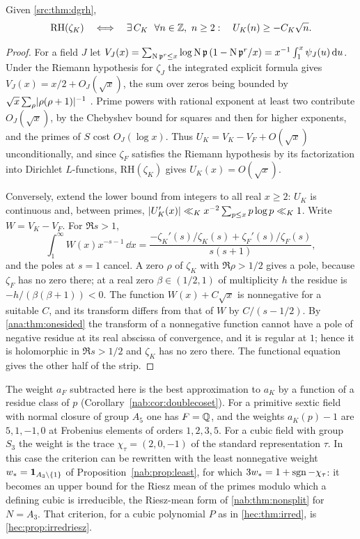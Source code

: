 \begin{theorem}\label{nab:thm:missing}
Given \cref{src:thm:dgrh},
\[
 \mathrm{RH}(\zeta_K)\quad\Longleftrightarrow\quad
 \exists\,C_K\ \ \forall n\in\mathbb{Z},\ n\ge2:\quad U_K(n)\ge-C_K\sqrt n .
\]
\end{theorem}
\begin{proof}
For a field $J$ let
$V_J(x)=\sum_{\operatorname{N}\mathfrak p^r\le x}\log\operatorname{N}\mathfrak p\,(1-\operatorname{N}\mathfrak p^r/x)
=x^{-1}\int_1^x\psi_J(u)\,\mathrm{d} u$. Under the Riemann hypothesis for $\zeta_J$ the integrated
explicit formula gives $V_J(x)=x/2+O_J(\sqrt x)$, the sum over zeros being bounded by
$\sqrt x\sum_\rho\lvert\rho(\rho+1)\rvert^{-1}$ \cite{GrenieMolteni2016Smoothed}. Prime powers
with rational exponent at least two contribute $O_J(\sqrt x)$, by the Chebyshev bound for
squares and then for higher exponents, and the primes of $S$ cost $O_J(\log x)$. Thus
$U_K=V_K-V_F+O(\sqrt x)$ unconditionally, and since $\zeta_F$ satisfies the Riemann
hypothesis by its factorization into Dirichlet $L$-functions, $\mathrm{RH}(\zeta_K)$ gives
$U_K(x)=O(\sqrt x)$.

Conversely, extend the lower bound from integers to all real $x\ge2$: $U_K$ is continuous
and, between primes, $\lvert U_K'(x)\rvert\ll_Kx^{-2}\sum_{p\le x}p\log p\ll_K1$. Write
$W=V_K-V_F$. For $\Re s>1$,
\[
 \int_1^\infty W(x)x^{-s-1}\,\dd x
 =\frac{-\zeta_K'(s)/\zeta_K(s)+\zeta_F'(s)/\zeta_F(s)}{s(s+1)},
\]
and the poles at $s=1$ cancel. A zero $\rho$ of $\zeta_K$ with $\Re\rho>1/2$ gives a pole,
because $\zeta_F$ has no zero there; at a real zero $\beta\in(1/2,1)$ of multiplicity $h$
the residue is $-h/(\beta(\beta+1))<0$. The function $W(x)+C\sqrt x$ is nonnegative for a
suitable $C$, and its transform differs from that of $W$ by $C/(s-1/2)$. By
\cref{ana:thm:onesided} the transform of a nonnegative function cannot have a pole of
negative residue at its real abscissa of convergence, and it is regular at $1$; hence it is
holomorphic in $\Re s>1/2$ and $\zeta_K$ has no zero there. The functional equation gives
the other half of the strip.
\end{proof}


The weight $a_F$ subtracted here is the best approximation to $a_K$ by a function of a
residue class of $p$ (Corollary~\ref{nab:cor:doublecoset}). For a primitive sextic field with
normal closure of group $A_5$ one has $F=\mathbb{Q}$, and the weights $a_K(p)-1$ are $5,1,-1,0$ at
Frobenius elements of orders $1,2,3,5$. For a cubic field with group $S_3$ the weight is
the trace $\chi_\tau=(2,0,-1)$ of the standard representation $\tau$. In this case the
criterion can be rewritten with the least nonnegative weight
$w_*=\mathbf{1}_{A_3\setminus\{1\}}$ of Proposition~\ref{nab:prop:least}, for which
$3w_*=1+\operatorname{sgn}-\chi_\tau$: it becomes an upper bound for the Riesz mean of the primes
modulo which a defining cubic is irreducible, the Riesz-mean form of
\cref{nab:thm:nonsplit} for $N=A_3$. That criterion, for a cubic polynomial $P$ as in
\cref{hec:thm:irred}, is \cref{hec:prop:irredriesz}.


